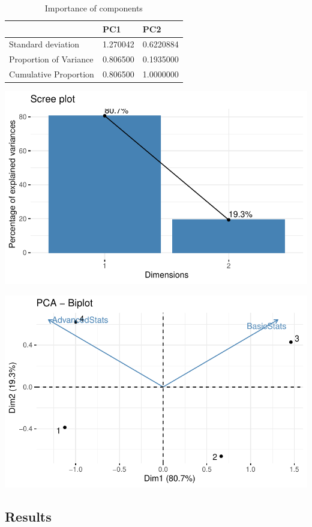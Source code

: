 \documentclass[
  letterpaper,
  DIV=11,
  numbers=noendperiod]{scrreprt}
\begin{document}
\begin{table}

\caption{Importance of components}
\centering
\begin{tabular}[t]{l|l|l}
\hline
  & PC1 & PC2\\
\hline
Standard deviation & 1.270042 & 0.6220884\\
\hline
Proportion of Variance & 0.806500 & 0.1935000\\
\hline
Cumulative Proportion & 0.806500 & 1.0000000\\
\hline
\end{tabular}
\end{table}

\includegraphics{examples_files/figure-pdf/unnamed-chunk-1-1.pdf}

\includegraphics{examples_files/figure-pdf/unnamed-chunk-1-2.pdf}

\hypertarget{results}{%
\subsection{Results}\label{results}}
\end{document}
